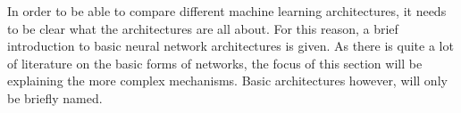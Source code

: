 In order to be able to compare different machine learning architectures, it needs to be clear what the architectures are all about. 
For this reason, a brief introduction to basic neural network architectures is given. 
As there is quite a lot of literature on the basic forms of networks, the focus of this section will be explaining the more complex mechanisms.
Basic architectures however, will only be briefly named. 

